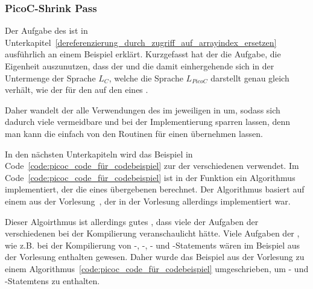 \subsubsection{PicoC-Shrink Pass}
\label{picoc_shrink_pass}
\label{sec:picoc_shrink_pass_zweck}

Der Aufgabe des  ist in Unterkapitel~\ref{dereferenzierung_durch_zugriff_auf_arrayindex_ersetzen} ausführlich an einem Beispiel erklärt. Kurzgefasst hat der  die Aufgabe, die Eigenheit auszunutzen, dass der   und die damit einhergehende   sich in der Untermenge der Sprache $L_{C}$, welche die Sprache $L_{PicoC}$ darstellt genau gleich verhält, wie der  für den  auf den  eines  .

Daher wandelt der  alle Verwendungen des   im jeweiligen  in   um, sodass sich dadurch viele vermeidbare  und  bei der Implementierung sparren lassen, denn man kann die   einfach von den Routinen für einen   übernehmen lassen.


In den nächsten Unterkapiteln wird das Beispiel in Code~\ref{code:picoc_code_für_codebeispiel} zur  der verschiedenen  verwendet. Im Code~\ref{code:picoc_code_für_codebeispiel} ist in der Funktion  ein  Algorithmus implementiert, der die  eines übergebenen  berechnet. Der Algorithmus basiert auf einem  aus der Vorlesung~\cite{scholl_betriebssysteme_2020}, der in der Vorlesung allerdings  implementiert war.

Dieser  Algoirthmus ist allerdings  gutes , dass viele der Aufgaben der verschiedenen  bei der Kompilierung veranschaulicht hätte. Viele Aufgaben der , wie z.B. bei der Kompilierung von -, -, - und -Statements wären im Beispiel aus der Vorlesung  enthalten gewesen. Daher wurde das Beispiel aus der Vorlesung zu einem  Algorithmus~\ref{code:picoc_code_für_codebeispiel} umgeschrieben, um - und -Statemtens zu enthalten.

